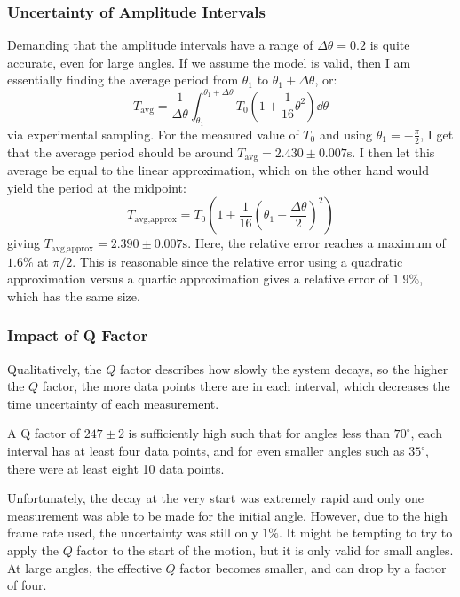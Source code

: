 \documentclass[%
 reprint,
 amsmath,amssymb
 aps,
]{revtex4-2}
\begin{document}
\subsubsection{Uncertainty of Amplitude Intervals}
Demanding that the amplitude intervals have a range of $\Delta \theta = 0.2$ is quite accurate, even for large angles. If we assume the model is valid, then I am essentially finding the average period from $\theta_1$ to $\theta_1+\Delta \theta$, or:
\begin{equation}
    T_\text{avg} = \frac{1}{\Delta \theta}\int_{\theta_1}^{\theta_1+\Delta \theta} T_0\left(1+\frac{1}{16}\theta^2\right)\dd{\theta}
    \label{eq:}
\end{equation}
via experimental sampling. For the measured value of $T_0$ and using $\theta_1=-\frac{\pi}{2}$, I get that the average period should be around $T_\text{avg}=2.430 \pm 0.007\si{\second}$. I then let this average be equal to the linear approximation, which on the other hand would yield the period at the midpoint:
\begin{equation}
    T_\text{avg,approx} = T_0\left(1+\frac{1}{16}\left(\theta_1+\frac{\Delta \theta}{2}\right)^2\right)
    \label{eq:}
\end{equation}
giving $T_\text{avg,approx}=2.390 \pm 0.007 \si{\second}$. Here, the relative error reaches a maximum of $1.6\%$ at $\pi/2$. This is reasonable since the relative error using a quadratic approximation versus a quartic approximation gives a relative error of $1.9\%$, which has the same size.

\subsubsection{Impact of Q Factor}
Qualitatively, the $Q$ factor describes how slowly the system decays, so the higher the $Q$ factor, the more data points there are in each interval, which decreases the time uncertainty of each measurement.

A Q factor of $247\pm 2$ is sufficiently high such that for angles less than $70^\circ$, each interval has at least four data points, and for even smaller angles such as $35^\circ$, there were at least eight 10 data points.

Unfortunately, the decay at the very start was extremely rapid and only one measurement was able to be made for the initial angle. However, due to the high frame rate used, the uncertainty was still only $1\%$. It might be tempting to try to apply the $Q$ factor to the start of the motion, but it is only valid for small angles. At large angles, the effective $Q$ factor becomes smaller, and can drop by a factor of four.
\end{document}
